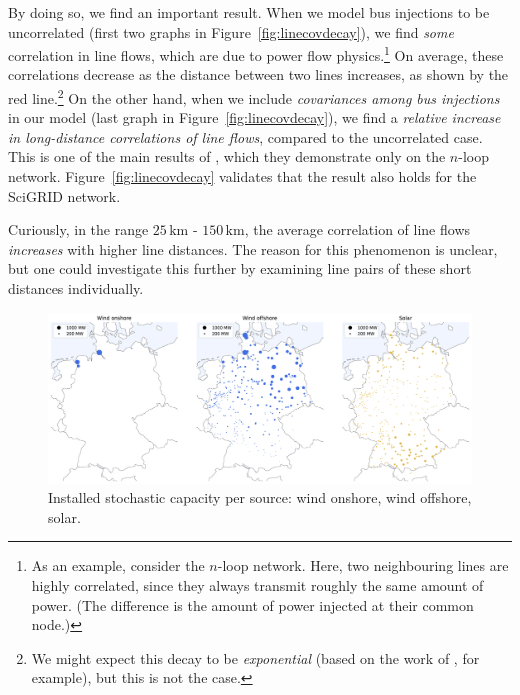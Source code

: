 \documentclass[main.tex]{subfiles}
\begin{document}
By doing so, we find an important result. When we model bus injections to be uncorrelated (first two graphs in Figure~\ref{fig:linecovdecay}), we find \emph{some} correlation in line flows, which are due to power flow physics.\footnote{As an example, consider the $n$-loop network. Here, two neighbouring lines are highly correlated, since they always transmit roughly the same amount of power. (The difference is the amount of power injected at their common node.)} On average, these correlations decrease as the distance between two lines increases, as shown by the red line.\footnote{We might expect this decay to be \emph{exponential} (based on the work of \cite{Jung2016}, for example), but this is not the case.} 
On the other hand, when we include \emph{covariances among bus injections} in our model (last graph in Figure~\ref{fig:linecovdecay}), we find a \emph{relative increase in long-distance correlations of line flows}, compared to the uncorrelated case. This is one of the main results of \cite{Nesti2018emergentfailures}, which they demonstrate only on the $n$-loop network. Figure~\ref{fig:linecovdecay} validates that the result also holds for the SciGRID network.

Curiously, in the range $25\,\si{\kilo\meter}$ - $150\,\si{\kilo\meter}$, the average correlation of line flows \emph{increases} with higher line distances. The reason for this phenomenon is unclear, but one could investigate this further by examining line pairs of these short distances individually.

%
\begin{figure}
    \centering
    \includegraphics[width=\textwidth]{img/installed_stochastic_capacity.pdf}
    \caption{Installed stochastic capacity per source: wind onshore, wind offshore, solar.}
    \label{fig:solarwind}
\end{figure}
\end{document}
